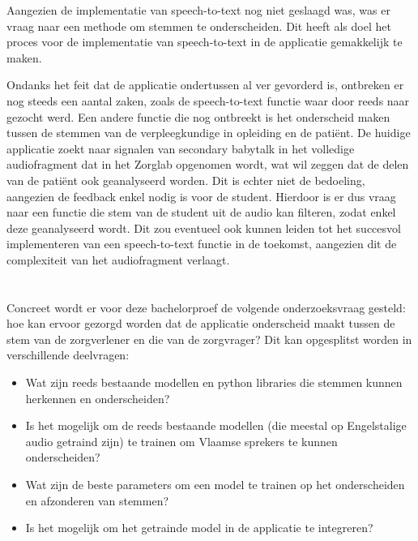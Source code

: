 Aangezien de implementatie van speech-to-text nog niet geslaagd was, was er vraag naar een methode om stemmen te onderscheiden. Dit heeft als doel het proces voor de implementatie van speech-to-text in de applicatie gemakkelijk te maken.

Ondanks het feit dat de applicatie ondertussen al ver gevorderd is, ontbreken er nog steeds een aantal zaken, zoals de speech-to-text functie waar door \textcite{Schryver2024} reeds naar gezocht werd. Een andere functie die nog ontbreekt is het onderscheid maken tussen de stemmen van de verpleegkundige in opleiding en de patiënt. De huidige applicatie zoekt naar signalen van secondary babytalk in het volledige audiofragment dat in het Zorglab opgenomen wordt, wat wil zeggen dat de delen van de patiënt ook geanalyseerd worden. Dit is echter niet de bedoeling, aangezien de feedback enkel nodig is voor de student. Hierdoor is er dus vraag naar een functie die stem van de student uit de audio kan filteren, zodat enkel deze geanalyseerd wordt. Dit zou eventueel ook kunnen leiden tot het succesvol implementeren van een speech-to-text functie in de toekomst, aangezien dit de complexiteit van het audiofragment verlaagt.

\section{}%
\label{sec:onderzoeksvraag}

Concreet wordt er voor deze bachelorproef de volgende onderzoeksvraag gesteld: hoe kan ervoor gezorgd worden dat de applicatie onderscheid maakt tussen de stem van de zorgverlener en die van de zorgvrager? Dit kan opgesplitst worden in verschillende deelvragen:
\begin{itemize}
	\item Wat zijn reeds bestaande modellen en python libraries die stemmen kunnen herkennen en onderscheiden?
	\item Is het mogelijk om de reeds bestaande modellen (die meestal op Engelstalige audio getraind zijn) te trainen om Vlaamse sprekers te kunnen onderscheiden?
	\item Wat zijn de beste parameters om een model te trainen op het onderscheiden en afzonderen van stemmen?
	\item Is het mogelijk om het getrainde model in de applicatie te integreren?
\end{itemize} 

